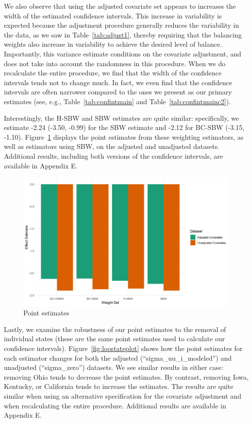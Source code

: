 \documentclass[aoas]{imsart}
\theoremstyle{plain}
\theoremstyle{remark}
\begin{document}
We also observe that using the adjusted covariate set appears to increases the width of the estimated confidence intervals. This increase in variability is expected because the adjustment procedure generally reduces the variability in the data, as we saw in Table~\ref{tab:adjust1}, thereby requiring that the balancing weights also increase in variability to achieve the desired level of balance. Importantly, this variance estimate conditions on the covariate adjustment, and does not take into account the randomness in this procedure. When we do recalculate the entire procedure, we find that the width of the confidence intervals tends not to change much. In fact, we even find that the confidence intervals are often narrower compared to the ones we present as our primary estimates (see, e.g., Table~\ref{tab:confintmain} and Table~\ref{tab:confintmainc2}).

Interestingly, the H-SBW and SBW estimates are quite similar: specifically, we estimate -2.24 (-3.50, -0.99) for the SBW estimate and -2.12 for BC-SBW (-3.15, -1.10). Figure~\ref{fig:estimators} displays the point estimates from these weighting estimators, as well as estimators using SBW, on the adjusted and unadjusted datasets. Additional results, including both versions of the confidence intervals, are available in Appendix E.

\begin{figure}[H]
\begin{center}
    \caption{Point estimates}
    \label{fig:estimators}
    \includegraphics[scale=0.6]{01_Plots/point-estimates-c1.png}
\end{center}
\end{figure}

Lastly, we examine the robustness of our point estimates to the removal of individual states (these are the same point estimates used to calculate our confidence intervals). Figure~\ref{fig:loostateplot} shows how the point estimates for each estimator changes for both the adjusted (``sigma\_uu\_i\_modeled'') and unadjusted (``sigma\_zero'') datasets. We see similar results in either case: removing Ohio tends to decrease the point estimates. By contrast, removing Iowa, Kentucky, or California tends to increase the estimates. The results are quite similar when using an alternative specification for the covariate adjustment and when recalculating the entire procedure. Additional results are available in Appendix E. 
\end{document}
